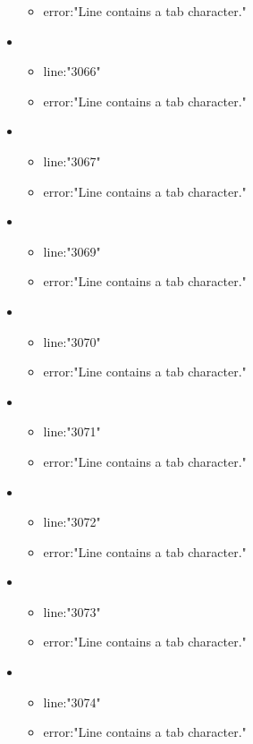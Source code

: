 \begin{itemize}
\begin{itemize}
		\item error:"Line contains a tab character." 
	\end{itemize}
	\item 
	\begin{itemize} 
		\item line:"3066" 
		\item error:"Line contains a tab character." 
	\end{itemize}
	\item 
	\begin{itemize} 
		\item line:"3067" 
		\item error:"Line contains a tab character." 
	\end{itemize}
	\item 
	\begin{itemize} 
		\item line:"3069" 
		\item error:"Line contains a tab character." 
	\end{itemize}
	\item 
	\begin{itemize} 
		\item line:"3070" 
		\item error:"Line contains a tab character." 
	\end{itemize}
	\item 
	\begin{itemize} 
		\item line:"3071" 
		\item error:"Line contains a tab character." 
	\end{itemize}
	\item 
	\begin{itemize} 
		\item line:"3072" 
		\item error:"Line contains a tab character." 
	\end{itemize}
	\item 
	\begin{itemize} 
		\item line:"3073" 
		\item error:"Line contains a tab character." 
	\end{itemize}
	\item 
	\begin{itemize} 
		\item line:"3074" 
		\item error:"Line contains a tab character." 
	\end{itemize}

\end{itemize}
